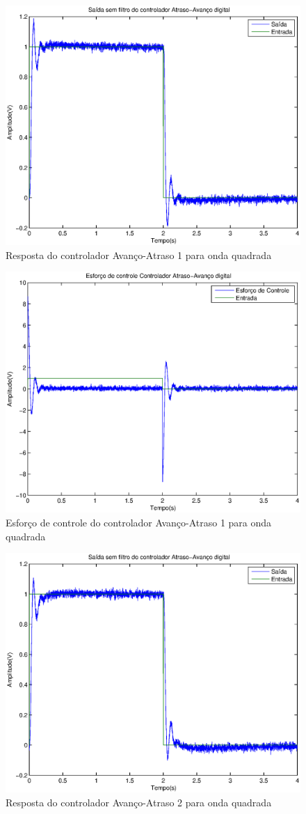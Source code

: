 \documentclass{article}
\begin{document}
\begin{figure}[H]
	\centering
	\includegraphics[width=0.8\linewidth]{ysemfiltro45}
	\caption{Resposta do controlador Avanço-Atraso 1 para onda quadrada}
	\label{fig:ysemfiltro45}
\end{figure}
\begin{figure}[H]
	\centering
	\includegraphics[width=0.8\linewidth]{upid45}
	\caption{Esforço de controle do controlador Avanço-Atraso 1 para onda quadrada}
	\label{fig:upid45}
\end{figure}
\begin{figure}[H]
	\centering
	\includegraphics[width=0.8\linewidth]{ysemfiltro50}
	\caption{Resposta do controlador Avanço-Atraso 2 para onda quadrada}
	\label{fig:ysemfiltro50}
\end{figure}
\end{document}
